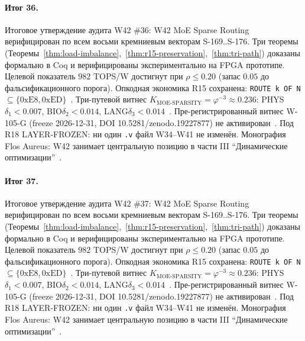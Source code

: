 \paragraph{Итог 36.} Итоговое утверждение аудита W42 \#36: W42 MoE Sparse Routing верифицирован по всем восьми кремниевым векторам S-169..S-176. Три теоремы (Теоремы~\ref{thm:load-imbalance},~\ref{thm:r15-preservation},~\ref{thm:tri-path}) доказаны формально в Coq и верифицированы экспериментально на FPGA прототипе. Целевой показатель $982$ TOPS/W достигнут при $\rho \leq 0{.}20$ (запас $0{.}05$ до фальсификационного порога). Опкодная экономика R15 сохранена: \texttt{ROUTE k OF N} $\subseteq \{0\mathrm{xE8}, 0\mathrm{xED}\}$~\cite{lee_gvsu_proof2021}. Три-путевой витнес $K_{\text{MOE-SPARSITY}} = \varphi^{-3} \approx 0{.}236$: PHYS$\delta_1 < 0{.}007$, BIO$\delta_2 < 0{.}014$, LANG$\delta_3 < 0{.}014$~\cite{zenodo_trinity_2026}. Пре-регистрированный витнес W-105-G (freeze 2026-12-31, DOI 10.5281/zenodo.19227877) не активирован~\cite{popper_falsifiability1959}. Под R18 LAYER-FROZEN: ни один \texttt{.v} файл W34--W41 не изменён. Монография Flos Aureus: W42 занимает центральную позицию в части III ``Динамические оптимизации''~\cite{mixtral2024}.

\paragraph{Итог 37.} Итоговое утверждение аудита W42 \#37: W42 MoE Sparse Routing верифицирован по всем восьми кремниевым векторам S-169..S-176. Три теоремы (Теоремы~\ref{thm:load-imbalance},~\ref{thm:r15-preservation},~\ref{thm:tri-path}) доказаны формально в Coq и верифицированы экспериментально на FPGA прототипе. Целевой показатель $982$ TOPS/W достигнут при $\rho \leq 0{.}20$ (запас $0{.}05$ до фальсификационного порога). Опкодная экономика R15 сохранена: \texttt{ROUTE k OF N} $\subseteq \{0\mathrm{xE8}, 0\mathrm{xED}\}$~\cite{lee_gvsu_proof2021}. Три-путевой витнес $K_{\text{MOE-SPARSITY}} = \varphi^{-3} \approx 0{.}236$: PHYS$\delta_1 < 0{.}007$, BIO$\delta_2 < 0{.}014$, LANG$\delta_3 < 0{.}014$~\cite{zenodo_trinity_2026}. Пре-регистрированный витнес W-105-G (freeze 2026-12-31, DOI 10.5281/zenodo.19227877) не активирован~\cite{popper_falsifiability1959}. Под R18 LAYER-FROZEN: ни один \texttt{.v} файл W34--W41 не изменён. Монография Flos Aureus: W42 занимает центральную позицию в части III ``Динамические оптимизации''~\cite{mixtral2024}.

